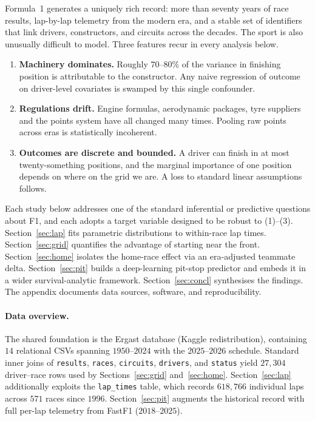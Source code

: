 \documentclass[11pt,a4paper]{article}
\newcommand{\code}[1]{\texttt{\small #1}}
\theoremstyle{remark}
\begin{document}
Formula~1 generates a uniquely rich record: more than seventy years of
race results, lap-by-lap telemetry from the modern era, and a stable
set of identifiers that link drivers, constructors, and circuits across
the decades. The sport is also unusually difficult to model. Three
features recur in every analysis below.
\begin{enumerate}
  \item \textbf{Machinery dominates.} Roughly $70$--$80\%$ of the
  variance in finishing position is attributable to the constructor.
  Any naive regression of outcome on driver-level covariates is
  swamped by this single confounder.
  \item \textbf{Regulations drift.} Engine formulas, aerodynamic
  packages, tyre suppliers and the points system have all changed many
  times. Pooling raw points across eras is statistically incoherent.
  \item \textbf{Outcomes are discrete and bounded.} A driver can
  finish in at most twenty-something positions, and the marginal
  importance of one position depends on where on the grid we are. A
  loss to standard linear assumptions follows.
\end{enumerate}

Each study below addresses one of the standard inferential or
predictive questions about F1, and each adopts a target variable
designed to be robust to (1)--(3). Section~\ref{sec:lap} fits parametric
distributions to within-race lap times. Section~\ref{sec:grid}
quantifies the advantage of starting near the front. Section~\ref{sec:home}
isolates the home-race effect via an era-adjusted teammate delta.
Section~\ref{sec:pit} builds a deep-learning pit-stop predictor and
embeds it in a wider survival-analytic framework. Section~\ref{sec:concl}
synthesises the findings. The appendix documents data sources,
software, and reproducibility.

\paragraph{Data overview.}
The shared foundation is the Ergast database (Kaggle redistribution),
containing $14$ relational CSVs spanning $1950$--$2024$ with the
$2025$--$2026$ schedule. Standard inner joins of
\code{results}, \code{races}, \code{circuits}, \code{drivers},
and \code{status} yield $27{,}304$ driver--race rows used by
Sections~\ref{sec:grid} and~\ref{sec:home}. Section~\ref{sec:lap}
additionally exploits the \code{lap\_times} table, which records
$618{,}766$ individual laps across $571$ races since $1996$.
Section~\ref{sec:pit} augments the historical record with full
per-lap telemetry from FastF1 ($2018$--$2025$).
\end{document}
